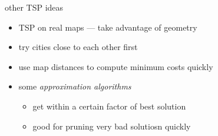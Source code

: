 \begin{frame}{other TSP ideas}
\begin{itemize}
\item TSP on real maps --- take advantage of geometry
\item try cities close to each other first
\item use map distances to compute minimum costs quickly
\item some \textit{approximation algorithms}
    \begin{itemize}
    \item get within a certain factor of best solution
    \item good for pruning very bad solutiosn quickly
    \end{itemize}
\end{itemize}
\end{frame}
